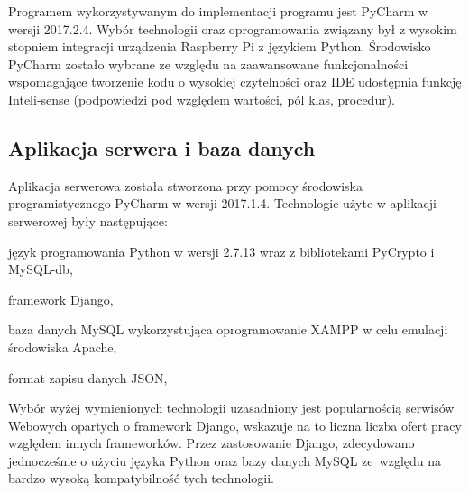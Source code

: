 Programem wykorzystywanym do implementacji programu jest PyCharm w wersji 2017.2.4. Wybór technologii oraz oprogramowania związany był z wysokim stopniem integracji urządzenia Raspberry Pi z językiem Python. Środowisko PyCharm zostało wybrane ze względu na zaawansowane funkcjonalności wspomagające tworzenie kodu o wysokiej czytelności oraz IDE udostępnia funkcję Inteli-sense (podpowiedzi pod względem wartości, pól klas, procedur).

\newpage
\subsection{Aplikacja serwera i baza danych}
Aplikacja serwerowa została stworzona przy pomocy środowiska programistycznego PyCharm w wersji 2017.1.4. Technologie użyte w aplikacji serwerowej były następujące:
\begin{itemize*}
	\item język programowania Python w wersji 2.7.13 wraz z bibliotekami \linebreak PyCrypto i MySQL-db,
	\item framework Django,
	\item baza danych MySQL wykorzystująca oprogramowanie XAMPP w celu emulacji środowiska Apache,
	\item format zapisu danych JSON,
\end{itemize*}

Wybór wyżej wymienionych technologii uzasadniony jest popularnością serwisów Webowych opartych o framework Django, wskazuje na to liczna liczba ofert pracy względem innych frameworków. Przez zastosowanie Django, zdecydowano jednocześnie o użyciu języka Python oraz bazy danych MySQL ze~względu na bardzo wysoką kompatybilność tych technologii. 

